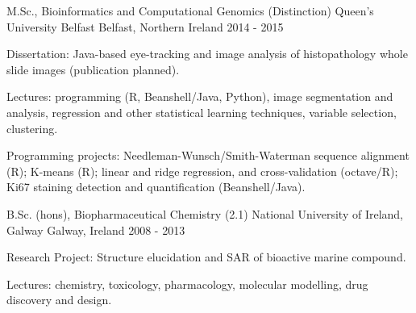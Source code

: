 


\begin{cventries}


\cventry
{M.Sc., Bioinformatics and Computational Genomics (Distinction)} %
{Queen's University Belfast} %
{Belfast, Northern Ireland} %
{2014 - 2015} %
{ %
\begin{cvitems}
\item {Dissertation: Java-based eye-tracking and image analysis of histopathology whole slide images (publication planned).}
\item {Lectures: programming (R, Beanshell/Java, Python), 
image segmentation and analysis, regression and other 
statistical learning techniques, variable selection, clustering.}
\item {Programming projects: Needleman-Wunsch/Smith-Waterman sequence alignment (R); K-means (R); linear and ridge regression, and cross-validation (octave/R); Ki67 staining detection and quantification (Beanshell/Java).}
\end{cvitems}
}
\cventry
{B.Sc. (hons), Biopharmaceutical Chemistry (2.1)} %
{National University of Ireland, Galway} %
{Galway, Ireland} %
{2008 - 2013} %
{ %
\begin{cvitems}
\item {Research Project: Structure elucidation and SAR of bioactive marine compound.}
\item {Lectures: chemistry, toxicology, pharmacology, molecular modelling,
drug discovery and design.}
\end{cvitems}
}



\end{cventries}
